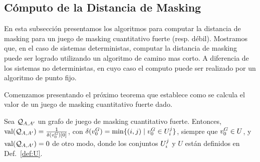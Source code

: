 \subsection{Cómputo de la Distancia de Masking}

En esta subsección presentamos los algoritmos para computar la distancia de masking para un juego de masking cuantitativo fuerte (resp. débil). Mostramos que, en el caso de sistemas deterministas, computar la distancia de masking puede ser logrado utilizando un algoritmo de camino mas corto. A diferencia de los sistemas no deterministas, en cuyo caso el computo puede ser realizado por un algoritmo de punto fijo.

Comenzamos presentando el próximo teorema que establece como se calcula el valor de un juego de masking cuantitativo fuerte dado.
%
\begin{theorem} \label{thm:quant_game}
  Sea $\QMStrGame$ un grafo de juego de masking cuantitativo fuerte.
  \sloppy Entonces, $\val(\QMStrGame) = \frac{1}{\pr{0}{\delta(\InitVertex^G)}}$, con
  $\delta(\InitVertex^G) = \min \{ (i,j) \mid  \InitVertex^G \in \setsUs \}$, siempre que
  $\InitVertex^G \in U$, y $\val(\QMStrGame)=0$ de otro modo, donde los conjuntos
   $\setsUs$ y $U$ están definidos en Def.~\ref{def:U}.

\end{theorem}
